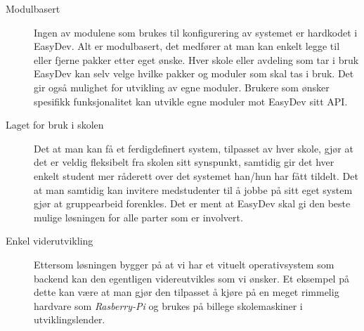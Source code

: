 \begin{description}
\item[Modulbasert] Ingen av modulene som brukes til konfigurering av systemet er hardkodet i EasyDev. Alt er modulbasert, det medfører at man kan enkelt legge til eller fjerne pakker etter eget ønske. Hver skole eller avdeling som tar i bruk EasyDev kan selv velge hvilke pakker og moduler som skal tas i bruk. Det gir også mulighet for utvikling av egne moduler. Brukere som ønsker spesifikk funksjonalitet kan utvikle egne moduler mot EasyDev sitt API. 
\item[Laget for bruk i skolen] Det at man kan få et ferdigdefinert system, tilpasset av hver skole, gjør at det er veldig fleksibelt fra skolen sitt synspunkt, samtidig gir det hver enkelt student mer råderett over det systemet han/hun har fått tildelt. Det at man samtidig kan invitere medstudenter til å jobbe på sitt eget system gjør at gruppearbeid forenkles. Det er ment at EasyDev skal gi den beste mulige løsningen for alle parter som er involvert.
\item[Enkel viderutvikling]
Ettersom løsningen bygger på at vi har et vituelt operativsystem som backend kan den egentligen videreutvikles som vi ønsker. Et eksempel på dette kan være at man gjør den tilpasset å kjøre på en meget rimmelig hardvare som \textit{Rasberry-Pi} og brukes på billege skolemaskiner i utviklingslender.
\end{description}